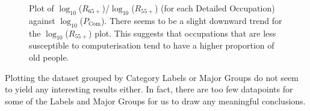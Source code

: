 \documentclass[11pt]{article}
\begin{document}
\begin{figure}[!htb]
	\centering
	\hfill
	\hfill
	\caption{Plot of $\log_{10}$($R_{65+}$)/$\log_{10}$($R_{55+}$) (for each Detailed Occupation) against $\log_{10}$($P_{\text{Com}}$). There seems to be a slight downward trend for the $\log_{10}$($R_{55+}$) plot. This suggests that occupations that are less susceptible to computerisation tend to have a higher proportion of old people.}
	\label{fig:logEP/OP against PCom}
\end{figure}


Plotting the dataset grouped by Category Labels or Major Groups do not seem to yield any interesting results either. In fact, there are too few datapoints for some of the Labels and Major Groups for us to draw any meaningful conclusions.
\end{document}
